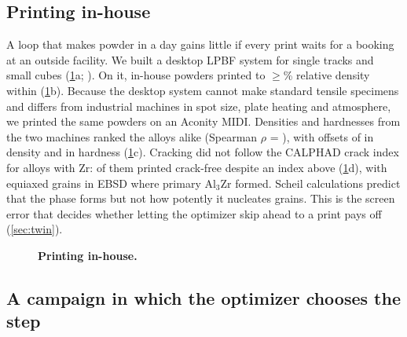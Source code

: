 \documentclass[11pt]{article}
\begin{document}
\subsection{Printing in-house}
\label{sec:print}

A loop that makes powder in a day gains little if every print waits for a
booking at an outside facility. We built a desktop LPBF system for single tracks
and small cubes (\cref{fig:print}a; ). On it,
 in-house powders printed to $\ge$\% relative density within
 (\cref{fig:print}b). Because the desktop
system cannot make standard tensile specimens and differs from industrial
machines in spot size, plate heating and atmosphere, we printed the same powders
on an Aconity MIDI. Densities and hardnesses from the two machines ranked the
alloys alike (Spearman $\rho$ = ), with offsets of  in density and
 in hardness (\cref{fig:print}c). Cracking did not follow the
CALPHAD crack index for alloys with Zr:  of them printed
crack-free despite an index above  (\cref{fig:print}d),
with equiaxed grains in EBSD where primary Al$_3$Zr formed. Scheil calculations
predict that the phase forms but not how potently it nucleates
grains.\cite{martin2017,croteau2018} This is the screen error that decides
whether letting the optimizer skip ahead to a print pays off (\cref{sec:twin}).

\begin{figure}[t]
\centering
{}
\caption{\textbf{Printing in-house.} }
\label{fig:print}
\end{figure}

\subsection{A campaign in which the optimizer chooses the step}
\label{sec:campaign}
\end{document}
